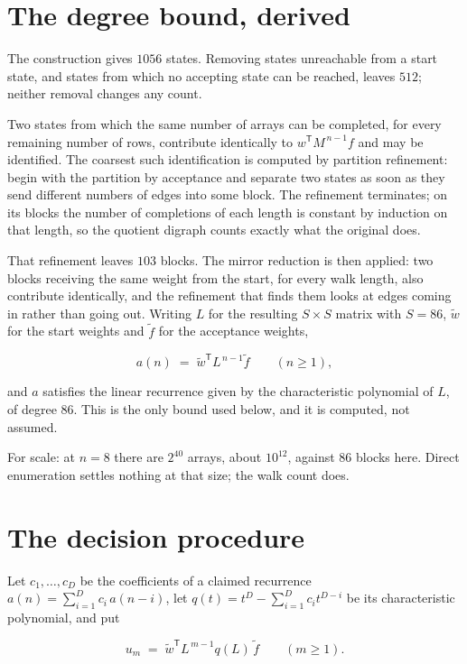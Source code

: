 \documentclass[11pt]{article}
\theoremstyle{definition}
\begin{document}
\section{The degree bound, derived}

The construction gives $1056$ states. Removing states unreachable from a start state, and states from which no accepting state can be reached, leaves $512$; neither removal changes any count.

Two states from which the same number of arrays can be completed, for every remaining number of rows, contribute identically to $w^{\mathsf T}M^{\,n-1}f$ and may be identified. The coarsest such identification is computed by partition refinement: begin with the partition by acceptance and separate two states as soon as they send different numbers of edges into some block. The refinement terminates; on its blocks the number of completions of each length is constant by induction on that length, so the quotient digraph counts exactly what the original does.

That refinement leaves $103$ blocks. The mirror reduction is then applied: two blocks receiving the same weight from the start, for every walk length, also contribute identically, and the refinement that finds them looks at edges coming in rather than going out. Writing $L$ for the resulting $S \times S$ matrix with $S = 86$, $\tilde w$ for the start weights and $\tilde f$ for the acceptance weights,

\[a(n) \;=\; \tilde w^{\mathsf T} L^{\,n-1} \tilde f \qquad (n \ge 1),\]

and $a$ satisfies the linear recurrence given by the characteristic polynomial of $L$, of degree $86$. This is the only bound used below, and it is computed, not assumed.

For scale: at $n = 8$ there are $2^{40}$ arrays, about $10^{12}$, against $86$ blocks here. Direct enumeration settles nothing at that size; the walk count does.

\section{The decision procedure}

Let $c_1,\dots,c_D$ be the coefficients of a claimed recurrence $a(n) = \sum_{i=1}^{D} c_i\,a(n-i)$, let $q(t) = t^{D} - \sum_{i=1}^{D} c_i t^{D-i}$ be its characteristic polynomial, and put

\[u_m \;=\; \tilde w^{\mathsf T} L^{\,m-1} q(L)\,\tilde f \qquad (m \ge 1).\]
\end{document}

